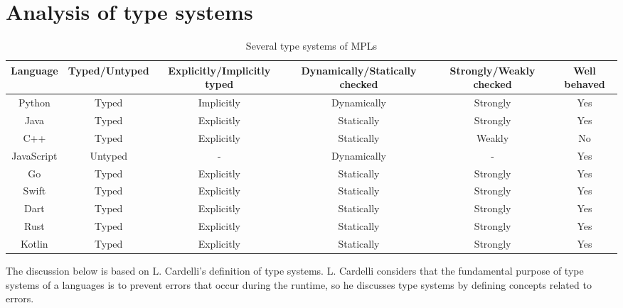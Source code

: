\section{Analysis of type systems}



\begin{table*}[htbp]
    \caption{Several type systems of MPLs}
    \label{tab:type}
    \begin{center}
        \begin{tabular}{cccccc}
            \toprule
            Language & Typed/Untyped & Explicitly/Implicitly typed &
            Dynamically/Statically checked & Strongly/Weakly checked & Well behaved\\
            \midrule
            Python     & Typed   & Implicitly & Dynamically & Strongly & Yes \\
            Java       & Typed   & Explicitly & Statically  & Strongly & Yes \\
            C++        & Typed   & Explicitly & Statically  & Weakly   & No  \\
            JavaScript & Untyped & -          & Dynamically & -        & Yes \\
            Go         & Typed   & Explicitly & Statically  & Strongly & Yes \\
            Swift      & Typed   & Explicitly & Statically  & Strongly & Yes \\
            Dart       & Typed   & Explicitly & Statically  & Strongly & Yes \\
            Rust       & Typed   & Explicitly & Statically  & Strongly & Yes \\
            Kotlin     & Typed   & Explicitly & Statically  & Strongly & Yes \\
            \bottomrule
        \end{tabular}
    \end{center}
\end{table*}


The discussion below is based on L. Cardelli's definition of type systems\cite{cardelli1996type}.
L. Cardelli considers that the fundamental purpose of
type systems of a languages is to prevent errors that occur during the runtime,
so he discusses type systems by defining concepts related to errors.

